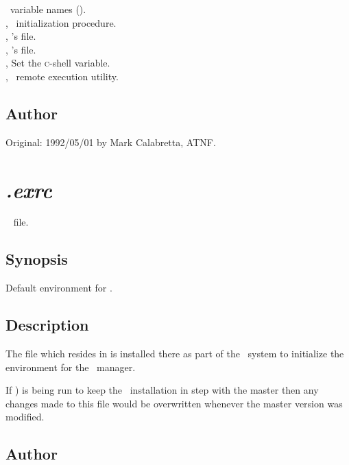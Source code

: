 \aipspp\ variable names ().\\
, \aipspp\ initialization procedure.\\
, 's  file.\\
, 's  file.\\
, Set the \textsc{c}-shell  variable.\\
, \aipspp\ remote execution utility.

\subsection*{Author}

Original: 1992/05/01 by Mark Calabretta, ATNF.


\newpage
\section{\textit{.exrc}}
\label{.exrc}

\aipspp\  file.

\subsection*{Synopsis}

\begin{synopsis}
   Default environment for .
\end{synopsis}

\subsection*{Description}

The  file which resides in  is installed there as
part of the \aipspp\ system to initialize the  environment for the
\aipspp\ manager.

If ) is being run to keep the \aipspp\ installation in step
with the master then any changes made to this file would be overwritten
whenever the master version was modified.

\subsection*{Author}

